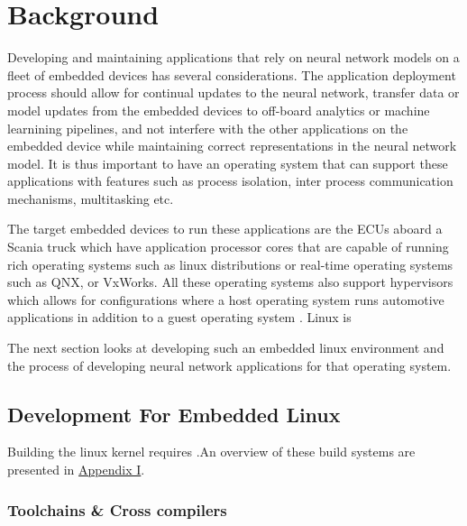 
\chapter{Background}

Developing and maintaining applications that rely on neural network models on a fleet of embedded devices has several considerations. The application deployment process should allow for continual updates to the neural network, transfer data or model updates from the embedded devices to off-board analytics or machine learnining pipelines, and not interfere with the other applications on the embedded device while maintaining correct representations in the neural network model. It is thus important to have an operating system that can support these applications with features such as process isolation, inter process communication mechanisms, multitasking etc.

The target embedded devices to run these applications are the ECUs aboard a Scania truck which have application processor cores that are capable of running rich operating systems such as linux distributions or real-time operating systems such as QNX, or VxWorks. All these operating systems also support hypervisors which allows for configurations where a host operating system runs automotive applications in addition to a guest operating system . Linux is

The next section looks at developing such an embedded linux environment and the process of developing neural network applications for that operating system.

\section[Development Process for Embedded Linux]{Development For Embedded Linux}

Building the linux kernel requires .An overview of these build systems are presented in \hyperref[buildsystems]{Appendix I}.

\subsection[SDKs \& Compiler Toolchains]{Toolchains \& Cross compilers}

